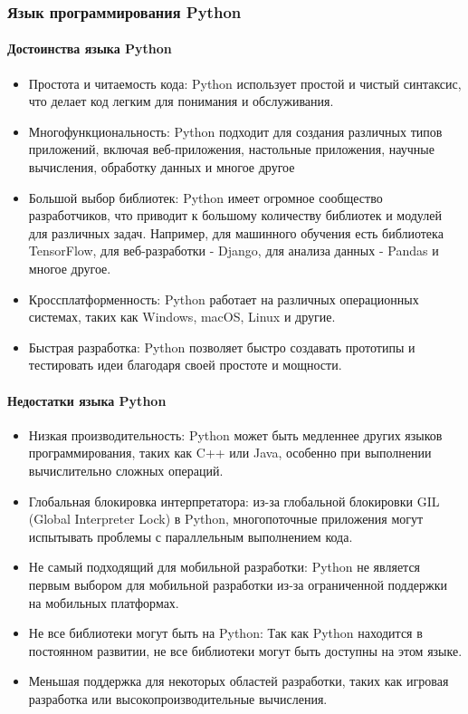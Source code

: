 \subsubsection{Язык программирования Python}

\paragraph{Достоинства языка Python}
\begin{itemize}
	\item Простота и читаемость кода: Python использует простой и чистый синтаксис, что делает код легким для понимания и обслуживания.
	\item Многофункциональность: Python подходит для создания различных типов приложений, включая веб-приложения, настольные приложения, научные вычисления, обработку данных и многое другое
	\item Большой выбор библиотек: Python имеет огромное сообщество разработчиков, что приводит к большому количеству библиотек и модулей для различных задач. Например, для машинного обучения есть библиотека TensorFlow, для веб-разработки - Django, для анализа данных - Pandas и многое другое.
	\item Кроссплатформенность: Python работает на различных операционных системах, таких как Windows, macOS, Linux и другие.
	\item Быстрая разработка: Python позволяет быстро создавать прототипы и тестировать идеи благодаря своей простоте и мощности.
\end{itemize}

\paragraph{Недостатки языка Python}

\begin{itemize}
	\item Низкая производительность: Python может быть медленнее других языков программирования, таких как C++ или Java, особенно при выполнении вычислительно сложных операций.
	\item Глобальная блокировка интерпретатора: из-за глобальной блокировки GIL (Global Interpreter Lock) в Python, многопоточные приложения могут испытывать проблемы с параллельным выполнением кода.
	\item Не самый подходящий для мобильной разработки: Python не является первым выбором для мобильной разработки из-за ограниченной поддержки на мобильных платформах.
	\item Не все библиотеки могут быть на Python: Так как Python находится в постоянном развитии, не все библиотеки могут быть доступны на этом языке.
	\item Меньшая поддержка для некоторых областей разработки, таких как игровая разработка или высокопроизводительные вычисления.
\end{itemize}

